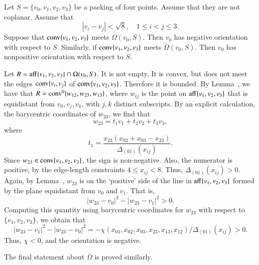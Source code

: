 \begin{tarskidata}
\begin{tarski}

\begin{lemma}
Let $S=\{v_0,v_1,v_2,v_3\}$ be a packing of four points.
Assume that they are not coplanar.
Assume that 
$$
|v_i-v_j|<\sqrt8,\quad 1\le i < j \le 3.
$$
  Suppose that
${\operatorname{conv}}\{v_1,v_2,v_3\}$ meets $\Omega(v_0,S)$.  Then $v_0$ has negative
orientation with respect to $S$.  Similarly, if 
${\operatorname{conv}}\{v_1,v_2,v_3\}$ meets $\bar\Omega(v_0,S)$.  Then $v_0$ has nonpositive
orientation with respect to $S$.
\end{lemma}

\begin{proved} Let $R = {\operatorname{aff}}\{v_1,v_2,v_3\}\cap\Omega(v_0,S)$.
It is not empty.  It is convex, but does not meet the edges
${\operatorname{conv}}\{v_i,v_j\}$ of ${\operatorname{conv}}\{v_1,v_2,v_3\}$.  Therefore it
is bounded.  By Lemma~, we have that
$R = {\operatorname{conv}}^0\{w_{12},w_{23},w_{13}\}$, where $w_{ij}$ is the point
on ${\operatorname{aff}}\{v_1,v_2,v_3\}$ that is equidistant from $v_0,v_j,v_k$,
with $j,k$ distinct subscripts.  By an explicit calculation,
the barycentric coordinates of $w_{23}$, we find that
   $$w_{23} = t_1 v_1 + t_2 v_2 + t_3 v_3,$$
where $$t_1 = \frac{x_{23} (x_{02} + x_{03} - x_{23})}{\Delta_{(01)}(x_{ij})}.$$
Since $w_{23}\in{\operatorname{conv}}\{v_1,v_2,v_3\}$, the sign is non-negative.
Also, the numerator is positive, by the edge-length constraints
$4\le x_{ij} < 8$.  Thus, $\Delta_{(01)}(x_{ij}) > 0$.
Again, by Lemma~, $w_{23}$ is on the `positive'
side of the line in ${\operatorname{aff}}\{v_1,v_2,v_3\}$ formed by the plane
equidistant from $v_0$ and $v_1$.  That is,
   $$|w_{23}-v_0|^2 - |w_{23}-v_1|^2 > 0.$$
Computing this quantity using barycentric coordinates for $w_{23}$
with respect
to $\{v_1,v_2,v_3\}$, we obtain that
   $$|w_{23}-v_1|^2 - |w_{23}-v_0|^2 = 
   -\chi(x_{01},x_{02},x_{03},x_{23},x_{13},x_{12})/{\Delta_{(01)}(x_{ij})} >0.$$
Thus, $\chi < 0$, and the orientation is negative.

The final statement about $\bar\Omega$ is proved similarly.
\swallowed\end{proved}
\end{tarski}








\end{tarskidata}
